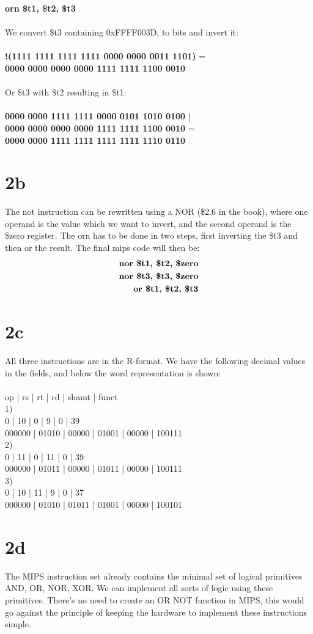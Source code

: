 \documentclass[10pt,a4paper]{article}
\begin{document}
\noindent \textbf{orn \$t1, \$t2, \$t3} \\\\
\noindent We convert \$t3 containing 0xFFFF003D, to bits and invert it:\\\\
\noindent \textbf{!(1111 1111 1111 1111 0000 0000 0011 1101)} =   \\
\noindent \textbf{0000 0000 0000 0000 1111 1111 1100 0010} \\\\
\noindent Or \$t3 with \$t2 resulting in \$t1: \\\\
\noindent \textbf{0000 0000 1111 1111 0000 0101 1010 0100} | \\
\noindent \textbf{0000 0000 0000 0000 1111 1111 1100 0010} = \\
\noindent \textbf{0000 0000 1111 1111 1111 1111 1110 0110}
\section*{2b}
The not instruction can be rewritten using a NOR (\$2.6 in the book), where one operand is the value which we want to invert, and the second operand is the \$zero register. The orn has to be done in two steps, first inverting the \$t3 and then or the result. The final mips code will then be:\\
\begin{eqnarray}
\noindent \textbf{nor \$t1, \$t2, \$zero} \\
\noindent \textbf{nor \$t3, \$t3, \$zero} \\
\noindent \textbf{or  \$t1, \$t2, \$t3} 
\end{eqnarray}
\section*{2c}
All three instructions are in the R-format. We have the following decimal values in the fields,
and below the word representation is shown: \\\\
op | rs | rt | rd | shamt | funct \\ 
1) \\ 0 | 10 | 0 | 9 | 0 | 39 \\
000000 | 01010 | 00000 | 01001 | 00000 | 100111 \\ 
2) \\ 0 | 11 | 0 | 11 | 0 | 39 \\
000000 | 01011 | 00000 | 01011 | 00000 | 100111 \\ 
3) \\ 0 | 10 | 11 | 9 | 0 | 37 \\
000000 | 01010 | 01011 | 01001 | 00000 | 100101
\section*{2d}
The MIPS instruction set already contains the minimal set of logical primitives AND, OR, NOR, XOR. We can implement all sorts of logic using these primitives. There's no need to create an OR NOT function in MIPS, this would go against the principle of keeping the hardware to implement these instructions simple.
\end{document}
